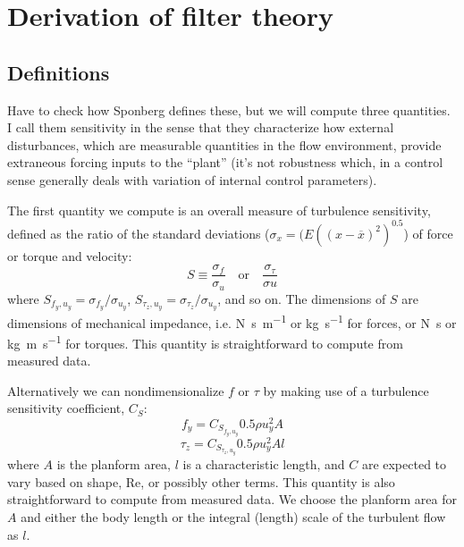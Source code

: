 \section{Derivation of filter theory}

\subsection{Definitions}
Have to check how Sponberg defines these, but we will compute three quantities.  I call them sensitivity in the sense that they characterize how external disturbances, which are measurable quantities in the flow environment, provide extraneous forcing inputs to the ``plant'' (it's not robustness which, in a control sense generally deals with variation of internal control parameters). 

The first quantity we compute is an overall measure of turbulence sensitivity, defined as the ratio of the standard deviations ($\sigma_x = (E((x-\overline{x})^2)^{0.5}$) of force or torque and velocity: 
\begin{equation}
S %
\equiv 
\frac{\sigma_f } %
{\sigma_u } %
\quad\mbox{or}\quad
\frac{\sigma_\tau}
{\sigma u}
\end{equation}
where $S_{f_y,u_y}=\sigma_{f_y}/\sigma_{u_y}$, $S_{\tau_z,u_y}=\sigma_{\tau_z}/\sigma_{u_y}$, and so on. The dimensions of $S$ are dimensions of mechanical impedance, i.e. \si{\newton\second\per\meter} or \si{\kilo\gram\per\second} for forces, or \si{\newton\second} or \si{\kilo\gram\meter\per\second} for torques. This quantity is straightforward to compute from measured data. 

Alternatively we can nondimensionalize $f$ or $\tau$ by making use of a turbulence sensitivity coefficient, $C_S$: 
\begin{equation}
f_y = C_{S_{f_y,u_y}} 0.5 \rho u_y^2 A
\end{equation}
\begin{equation}
\tau_z = C_{S_{\tau_z,u_y}} 0.5 \rho u_y^2 A l
\end{equation}
where $A$ is the planform area, $l$ is a characteristic length, and $C$ are expected to vary based on shape, $\mbox{Re}$, or possibly other terms. This quantity is also straightforward to compute from measured data.  We choose the planform area for $A$ and either the body length or the integral (length) scale of the turbulent flow as $l$.  

